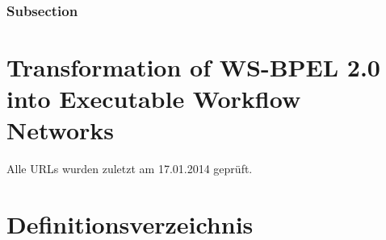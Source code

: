 \documentclass[paper=a5,twoside,fontsize=10pt, DIV=calc, headings=small,bibliography=totoc, listof=totoc]{scrbook}
\begin{document}
\subsection{Subsection}

%
\chapter{Transformation of WS-BPEL 2.0 into Executable Workflow Networks}
\label{chap:bpel-ewfn-transformation}
\resetchapterfooter

\printbibliography
Alle URLs wurden zuletzt am 17.01.2014 gepr\"uft.

\clearpage
\listoffigures
\listoftables

\chapter*{Definitionsverzeichnis}

\appendix


%

\end{document}

